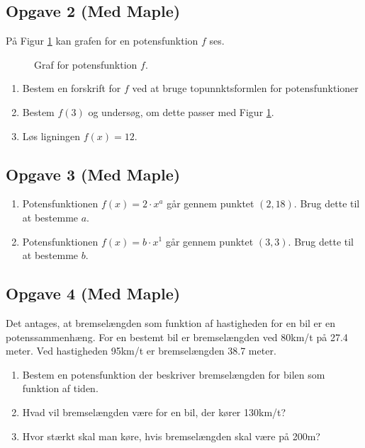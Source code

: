 \subsection*{Opgave 2 (Med Maple)}
På Figur \ref{fig:potensopg} kan grafen for en potensfunktion $f$ ses. 
\begin{figure}[H]
	\centering
	\caption{Graf for potensfunktion $f$.}
	\label{fig:potensopg}
\end{figure}

\begin{enumerate}[label=\roman*)]
	\item Bestem en forskrift for $f$ ved at bruge topunnktsformlen for potensfunktioner
	\item Bestem $f(3)$ og undersøg, om dette passer med Figur \ref{fig:potensopg}.
	\item Løs ligningen $f(x) = 12$.
\end{enumerate}




\subsection*{Opgave 3 (Med Maple)}
\begin{enumerate}
	\item Potensfunktionen $f(x) = 2\cdot x^a$ går gennem punktet $(2,18)$. Brug dette til at bestemme $a$.
	\item Potensfunktionen $f(x) = b\cdot x^1$ går gennem punktet $(3,3)$. Brug dette til at bestemme $b$.
\end{enumerate}

\subsection*{Opgave 4 (Med Maple)}
Det antages, at bremselængden som funktion af hastigheden for en bil er en potenssammenhæng. For en bestemt bil er bremselængden ved 80km/t på 27.4 meter. Ved hastigheden 95km/t er bremselængden 38.7 meter.
\begin{enumerate}[label=\roman*)]
	\item Bestem en potensfunktion der beskriver bremselængden for bilen som funktion af tiden.
	\item Hvad vil bremselængden være for en bil, der kører 130km/t?
	\item Hvor stærkt skal man køre, hvis bremselængden skal være på 200m?
\end{enumerate}

